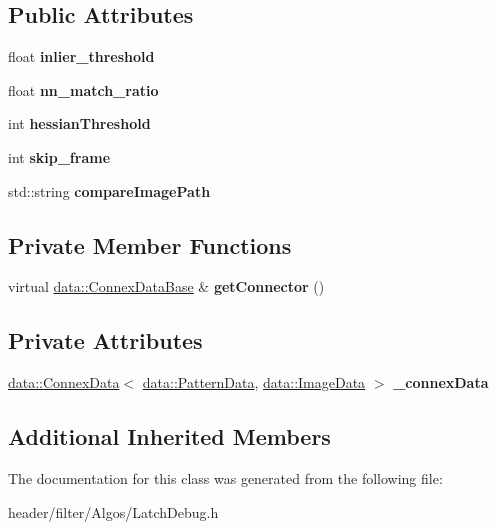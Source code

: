 \subsection*{Public Attributes}
\begin{DoxyCompactItemize}
\item 
\mbox{\label{classfilter_1_1algos_1_1_latch_debug_aeafc2536e10b2601990e465800ae6e26}} 
float {\bfseries inlier\+\_\+threshold}
\item 
\mbox{\label{classfilter_1_1algos_1_1_latch_debug_aefa14a6f9a7358d266bdfcff47960196}} 
float {\bfseries nn\+\_\+match\+\_\+ratio}
\item 
\mbox{\label{classfilter_1_1algos_1_1_latch_debug_a66bf9d2c2e122fd927d94453f5276d12}} 
int {\bfseries hessian\+Threshold}
\item 
\mbox{\label{classfilter_1_1algos_1_1_latch_debug_a02d98c40afb7671a3dbdfc5814c4eada}} 
int {\bfseries skip\+\_\+frame}
\item 
\mbox{\label{classfilter_1_1algos_1_1_latch_debug_ac00df47b66bfd0d14171757f428b624a}} 
std\+::string {\bfseries compare\+Image\+Path}
\end{DoxyCompactItemize}
\subsection*{Private Member Functions}
\begin{DoxyCompactItemize}
\item 
\mbox{\label{classfilter_1_1algos_1_1_latch_debug_ab2f5ec7baca520d6a88f5a4a0dd7695d}} 
virtual \hyperlink{classfilter_1_1data_1_1_connex_data_base}{data\+::\+Connex\+Data\+Base} \& {\bfseries get\+Connector} ()
\end{DoxyCompactItemize}
\subsection*{Private Attributes}
\begin{DoxyCompactItemize}
\item 
\mbox{\label{classfilter_1_1algos_1_1_latch_debug_a65f341c778f75ab723151e96d0f313c7}} 
\hyperlink{classfilter_1_1data_1_1_connex_data}{data\+::\+Connex\+Data}$<$ \hyperlink{classfilter_1_1data_1_1_pattern_data}{data\+::\+Pattern\+Data}, \hyperlink{classfilter_1_1data_1_1_image_data}{data\+::\+Image\+Data} $>$ {\bfseries \+\_\+connex\+Data}
\end{DoxyCompactItemize}
\subsection*{Additional Inherited Members}


The documentation for this class was generated from the following file\+:\begin{DoxyCompactItemize}
\item 
header/filter/\+Algos/Latch\+Debug.\+h\end{DoxyCompactItemize}
